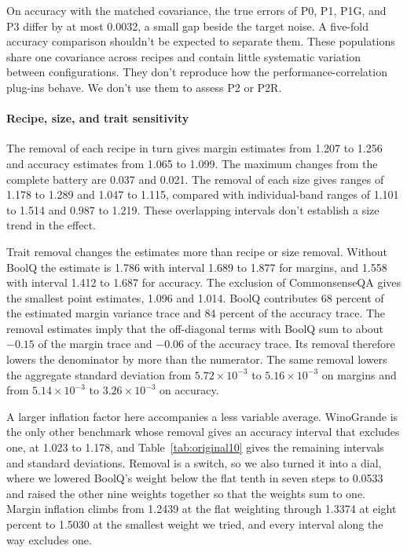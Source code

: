On accuracy with the matched covariance, the true errors of P0, P1, P1G, and P3 differ by at most 0.0032, a small gap beside the target noise. A five-fold accuracy comparison shouldn't be expected to separate them. These populations share one covariance across recipes and contain little systematic variation between configurations. They don't reproduce how the performance-correlation plug-ins behave. We don't use them to assess P2 or P2R.


\paragraph{Recipe, size, and trait sensitivity}
The removal of each recipe in turn gives margin estimates from 1.207 to 1.256 and accuracy estimates from 1.065 to 1.099. The maximum changes from the complete battery are 0.037 and 0.021. The removal of each size gives ranges of 1.178 to 1.289 and 1.047 to 1.115, compared with individual-band ranges of 1.101 to 1.514 and 0.987 to 1.219. These overlapping intervals don't establish a size trend in the effect.

Trait removal changes the estimates more than recipe or size removal. Without BoolQ the estimate is 1.786 with interval 1.689 to 1.877 for margins, and 1.558 with interval 1.412 to 1.687 for accuracy. The exclusion of CommonsenseQA gives the smallest point estimates, 1.096 and 1.014. BoolQ contributes 68 percent of the estimated margin variance trace and 84 percent of the accuracy trace. The removal estimates imply that the off-diagonal terms with BoolQ sum to about $-0.15$ of the margin trace and $-0.06$ of the accuracy trace. Its removal therefore lowers the denominator by more than the numerator. The same removal lowers the aggregate standard deviation from $5.72\times10^{-3}$ to $5.16\times10^{-3}$ on margins and from $5.14\times10^{-3}$ to $3.26\times10^{-3}$ on accuracy.

A larger inflation factor here accompanies a less variable average. WinoGrande is the only other benchmark whose removal gives an accuracy interval that excludes one, at 1.023 to 1.178, and Table~\ref{tab:original10} gives the remaining intervals and standard deviations. Removal is a switch, so we also turned it into a dial, where we lowered BoolQ's weight below the flat tenth in seven steps to 0.0533 and raised the other nine weights together so that the weights sum to one. Margin inflation climbs from 1.2439 at the flat weighting through 1.3374 at eight percent to 1.5030 at the smallest weight we tried, and every interval along the way excludes one.

